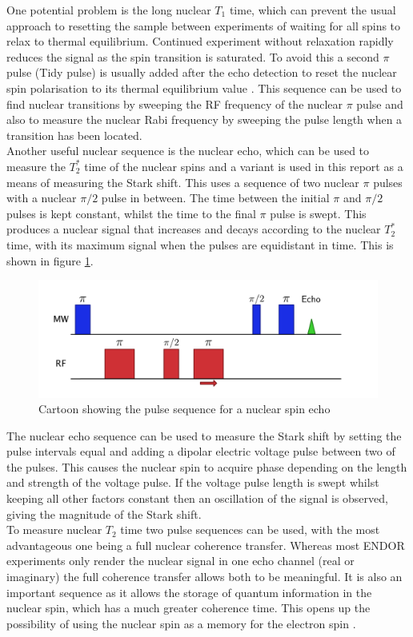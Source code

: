 One potential problem is the long nuclear $T_1$ time, which can prevent the usual approach to resetting the sample between experiments of waiting for all spins to relax to thermal equilibrium.
Continued experiment without relaxation rapidly reduces the signal as the spin transition is saturated.
To avoid this a second $\pi$ pulse (Tidy pulse) is usually added after the echo detection to reset the nuclear spin polarisation to its thermal equilibrium value \cite{Morton2008a}.
This sequence can be used to find nuclear transitions by sweeping the RF frequency of the nuclear $\pi$ pulse and also to measure the nuclear Rabi frequency by sweeping the pulse length when a transition has been located.
\\
Another useful nuclear sequence is the nuclear echo, which can be used to measure the $T_2^*$ time of the nuclear spins and a variant is used in this report as a means of measuring the Stark shift.
This uses a sequence of two nuclear $\pi$ pulses with a nuclear $\pi/2$ pulse in between. 
The time between the initial $\pi$ and $\pi/2$ pulses is kept constant, whilst the time to the final $\pi$ pulse is swept. 
This produces a nuclear signal that increases and decays according to the nuclear $T_2^*$ time, with its maximum signal when the pulses are equidistant in time.
This is shown in figure \ref{fig:nuclearecho}.

\begin{figure}
\centering
\includegraphics[width=\columnwidth]{Figures/NucEchoSequence2.pdf}
\caption[Nuclear echo pulse sequence]{Cartoon showing the pulse sequence for a nuclear spin echo}
\label{fig:nuclearecho}
\end{figure}

The nuclear echo sequence can be used to measure the Stark shift by setting the pulse intervals equal and adding a dipolar electric voltage pulse between two of the pulses.
This causes the nuclear spin to acquire phase depending on the length and strength of the voltage pulse.
If the voltage pulse length is swept whilst keeping all other factors constant then an oscillation of the signal is observed, giving the magnitude of the Stark shift.
\\
To measure nuclear $T_2$ time two pulse sequences can be used, with the most advantageous one being a full nuclear coherence transfer. 
Whereas most ENDOR experiments only render the nuclear signal in one echo channel (real or imaginary) the full coherence transfer allows both to be meaningful.
It is also an important sequence as it allows the storage of quantum information in the nuclear spin, which has a much greater coherence time.
This opens up the possibility of using the nuclear spin as a memory for the electron spin \cite{Morton2008b}.

